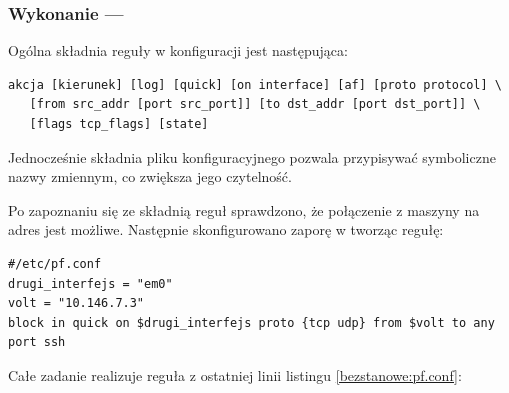 \subsubsection{Wykonanie --- \pf}
\label{bezstanowa:pf}

Ogólna składnia reguły w konfiguracji \pf{} jest następująca:

\begin{lstlisting}
akcja [kierunek] [log] [quick] [on interface] [af] [proto protocol] \
   [from src_addr [port src_port]] [to dst_addr [port dst_port]] \
   [flags tcp_flags] [state]
\end{lstlisting}

Jednocześnie składnia pliku konfiguracyjnego \pf{} pozwala przypisywać
symboliczne nazwy zmiennym, co zwiększa jego czytelność.

Po zapoznaniu się ze składnią reguł sprawdzono, że połączenie \ssh{} z maszyny
\volt{} na adres \emoip{} jest możliwe. Następnie skonfigurowano zaporę \pf{} w
tworząc regułę:

\begin{lstlisting}[label=bezstanowe:pf.conf]
#/etc/pf.conf
drugi_interfejs = "em0"
volt = "10.146.7.3"
block in quick on $drugi_interfejs proto {tcp udp} from $volt to any port ssh
\end{lstlisting}

\noindent Całe zadanie realizuje reguła z ostatniej linii listingu
\ref{bezstanowe:pf.conf}:

